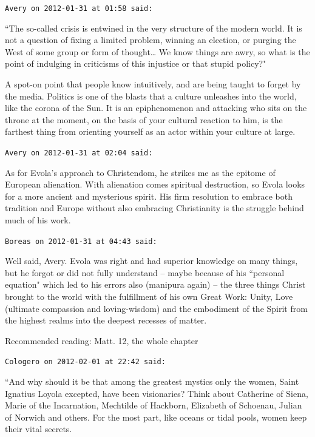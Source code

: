 \begin{footnotesize}\begin{sffamily}



\texttt{Avery on 2012-01-31 at 01:58 said: }

``The so-called crisis is entwined in the very structure of the modern world. It is not a question of fixing a limited problem, winning an election, or purging the West of some group or form of thought… We know things are awry, so what is the point of indulging in criticisms of this injustice or that stupid policy?"

A spot-on point that people know intuitively, and are being taught to forget by the media. Politics is one of the blasts that a culture unleashes into the world, like the corona of the Sun. It is an epiphenomenon and attacking who sits on the throne at the moment, on the basis of your cultural reaction to him, is the farthest thing from orienting yourself as an actor within your culture at large.


\hfill

\texttt{Avery on 2012-01-31 at 02:04 said: }

As for Evola's approach to Christendom, he strikes me as the epitome of European alienation. With alienation comes spiritual destruction, so Evola looks for a more ancient and mysterious spirit. His firm resolution to embrace both tradition and Europe without also embracing Christianity is the struggle behind much of his work.


\hfill

\texttt{Boreas on 2012-01-31 at 04:43 said: }

Well said, Avery. Evola was right and had superior knowledge on many things, but he forgot or did not fully understand – maybe because of his ``personal equation" which led to his errors also (manipura again) – the three things Christ brought to the world with the fulfillment of his own Great Work: Unity, Love (ultimate compassion and loving-wisdom) and the embodiment of the Spirit from the highest realms into the deepest recesses of matter.

Recommended reading: Matt. 12, the whole chapter


\hfill

\texttt{Cologero on 2012-02-01 at 22:42 said: }

``And why should it be that among the greatest mystics only the women, Saint Ignatius Loyola excepted, have been visionaries? Think about Catherine of Siena, Marie of the Incarnation, Mechtilde of Hackborn, Elizabeth of Schoenau, Julian of Norwich and others. For the most part, like oceans or tidal pools, women keep their vital secrets. 



\end{sffamily}
\end{footnotesize}
